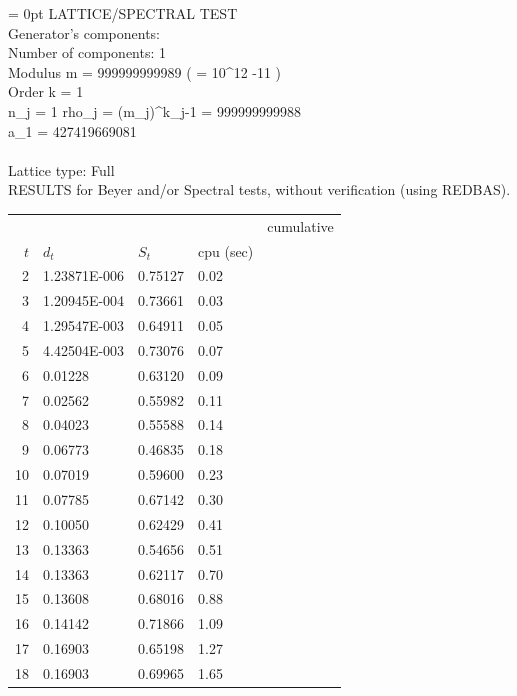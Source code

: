 \parindent = 0pt 
 LATTICE/SPECTRAL TEST \\
 Generator's components:\\
 Number of components:  1\\
   Modulus  m = 999999999989 ( = 10^12 -11 ) \\ 
   Order    k = 1 \\ 
   n_j        = 1
   rho_j = (m_j)^k_j-1 = 999999999988 \\ 
   a_1 = 427419669081 \\ 
\\
 Lattice type: Full \\


RESULTS for Beyer and/or Spectral tests, without verification (using REDBAS).\\

\begin {tabular}{|rlllr|}
\hline
 &&&&  cumulative \\
   $t$ &      $d_t$  &      $S_t$  &  cpu (sec)\\
\hline
    2  & 1.23871E-006 &     0.75127 &      0.02 \\
    3  & 1.20945E-004 &     0.73661 &      0.03 \\
    4  & 1.29547E-003 &     0.64911 &      0.05 \\
    5  & 4.42504E-003 &     0.73076 &      0.07 \\
    6  &      0.01228 &     0.63120 &      0.09 \\
    7  &      0.02562 &     0.55982 &      0.11 \\
    8  &      0.04023 &     0.55588 &      0.14 \\
    9  &      0.06773 &     0.46835 &      0.18 \\
   10  &      0.07019 &     0.59600 &      0.23 \\
   11  &      0.07785 &     0.67142 &      0.30 \\
   12  &      0.10050 &     0.62429 &      0.41 \\
   13  &      0.13363 &     0.54656 &      0.51 \\
   14  &      0.13363 &     0.62117 &      0.70 \\
   15  &      0.13608 &     0.68016 &      0.88 \\
   16  &      0.14142 &     0.71866 &      1.09 \\
   17  &      0.16903 &     0.65198 &      1.27 \\
   18  &      0.16903 &     0.69965 &      1.65 \\

\end{tabular}
